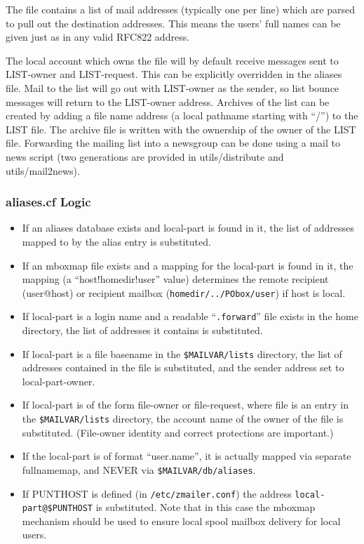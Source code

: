 The file contains a list of mail addresses (typically one per line)
which are parsed to pull out the destination addresses.  This means
the users' full names can be given just as in any valid RFC822 address.

The local account which owns the file will by default receive messages
sent to LIST-owner and LIST-request.  This can be explicitly overridden
in the aliases file.  Mail to the list will go out with LIST-owner as
the sender, so list bounce messages will return to the LIST-owner
address.  Archives of the list can be created by adding a file name
address (a local pathname starting with ``/'') to the LIST file.  The
archive file is written with the ownership of the owner of the LIST
file.  Forwarding the mailing list into a newsgroup
can be done using a mail to news script (two generations are provided
in utils/distribute and utils/mail2news).



\subsubsection{aliases.cf Logic}

\begin{itemize}
\item
If an aliases database exists and local-part is found in it, the list of
addresses mapped to by the alias entry is substituted.
\item
If an mboxmap file exists and a mapping for the local-part is found in it,
the mapping (a ``host!homedir!user'' value) determines the remote recipient
(user@host) or recipient mailbox ({\tt homedir/../PObox/user}) if host 
is local.
\item
If local-part is a login name and a readable ``{\tt .forward}'' file 
exists in the home directory, the list of addresses it contains is
substituted.
\item
If local-part is a file basename in the {\tt \$MAILVAR/lists} 
directory, the   list of addresses contained in the file is
substituted, and the sender address set to local-part-owner.
\item
If local-part is of the form file-owner or file-request, where file is
an entry in the {\tt \$MAILVAR/lists} directory, the account name 
of the owner of the file is substituted.   (File-owner identity and correct 
protections are important.)
\item
If the local-part is of format  ``user.name'',  it is actually mapped via
separate   fullnamemap, and NEVER via {\tt \$MAILVAR/db/aliases}.
\item
If PUNTHOST is defined (in {\tt /etc/zmailer.conf}) the address
{\tt local-part@\$PUNTHOST} is substituted.  Note that in this case
the mboxmap mechanism should be used to ensure local spool
mailbox delivery for local users.
\end{itemize}


